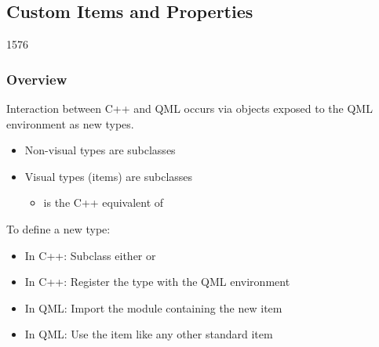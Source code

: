 %
%
%
%

\subsection{Custom Items and Properties}

\begin{slide}{1576}\frametitle{Overview}

Interaction between C++ and QML occurs via objects exposed to the
QML environment as new types.

\vspace*{0.5em}
\begin{itemize}
\item Non-visual types are  subclasses
\item Visual types (items) are  subclasses
  \begin{itemize}
  \item {} is the C++ equivalent of 
  \end{itemize}
\end{itemize}

\vspace*{0.5em}
To define a new type:

\begin{itemize}
\item In C++: Subclass either  or 
\item In C++: Register the type with the QML environment
\item In QML: Import the module containing the new item
\item In QML: Use the item like any other standard item
\end{itemize}

\end{slide}

